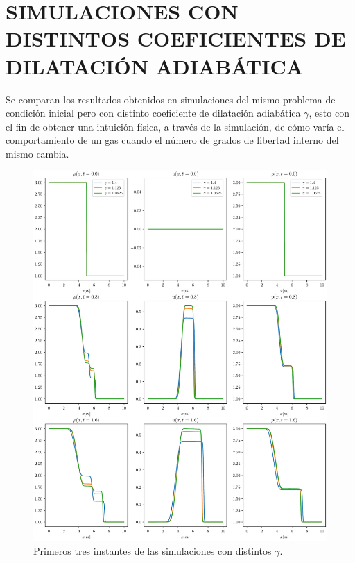 \chapter{SIMULACIONES CON DISTINTOS COEFICIENTES DE DILATACIÓN ADIABÁTICA}
\label{cap:5}
Se comparan los resultados obtenidos en simulaciones del mismo problema de condición inicial pero con distinto coeficiente de dilatación adiabática $\gamma$, esto con el fin de obtener una intuición física, a través de la simulación, de cómo varía el comportamiento de un gas cuando el número de grados de libertad interno del mismo cambia.
\begin{figure}[ht]
	\includegraphics[width=\linewidth]{../euler1D/experimentos/graficas_sod/1.pdf}
	\caption{Primeros tres instantes de las simulaciones con distintos $\gamma$.}
\end{figure}
